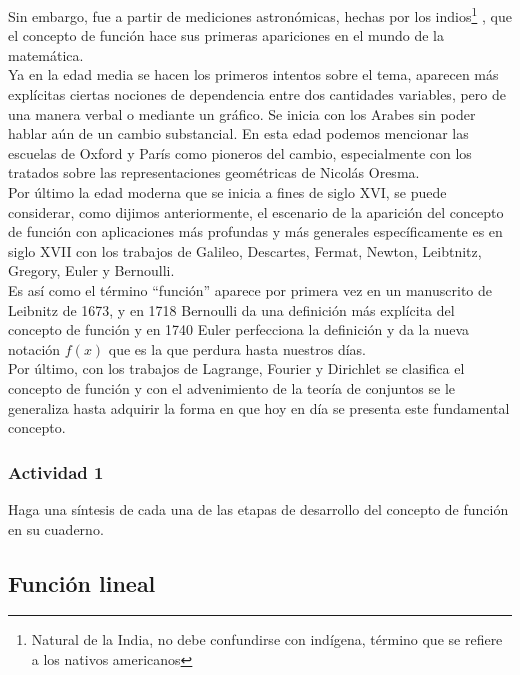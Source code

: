\documentclass[10pt]{article}
\begin{document}
Sin embargo, fue a partir de mediciones astronómicas, hechas por los indios\footnote{Natural de la India, no debe confundirse con indígena, término que se refiere a los nativos americanos} ,
que el concepto de función hace sus primeras apariciones en el mundo de la
matemática.\\

Ya en la edad media se hacen los primeros intentos sobre el tema, aparecen
más explícitas ciertas nociones de dependencia entre dos cantidades variables, pero de una manera verbal o mediante un gráfico. Se inicia con los Arabes sin poder hablar aún de un cambio substancial. En esta edad podemos mencionar las escuelas de Oxford y París como pioneros del cambio, especialmente con los tratados sobre las representaciones geométricas de Nicolás Oresma.\\

Por último la edad moderna que se inicia a fines de siglo XVI, se puede considerar, como dijimos anteriormente, el escenario de la aparición del concepto de función con aplicaciones más profundas y más generales específicamente es en siglo XVII con los trabajos de Galileo, Descartes, Fermat, Newton, Leibtnitz, Gregory, Euler y Bernoulli.\\

Es así como el término “función” aparece por primera vez en un manuscrito de
Leibnitz de 1673, y en 1718 Bernoulli da una definición más explícita del concepto de función y en 1740 Euler perfecciona la definición y da la nueva notación $f(x)$ que es la que perdura hasta nuestros días.\\

Por último, con los trabajos de Lagrange, Fourier y Dirichlet se clasifica el concepto de función y con el advenimiento de la teoría de conjuntos se le generaliza hasta adquirir la forma en que hoy en día se presenta este fundamental concepto.
\subsubsection*{Actividad 1}
Haga una s\'{i}ntesis de cada una de las etapas de desarrollo del concepto de funci\'{o}n en su cuaderno.
\subsection*{Funci\'{o}n lineal}
\end{document}
